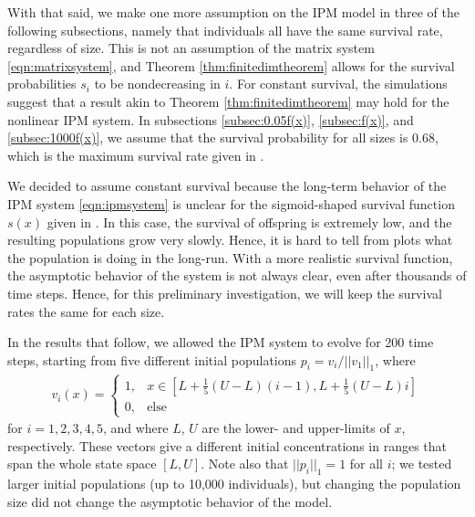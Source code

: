 With that said, we make one more assumption on the IPM model in three of the following subsections, namely that individuals all have the same survival rate, regardless of size. This is not an assumption of the matrix system \eqref{eqn:matrixsystem}, and Theorem \ref{thm:finitedimtheorem} allows for the survival probabilities $s_i$ to be nondecreasing in $i$. For constant survival, the simulations suggest that a result akin to Theorem \ref{thm:finitedimtheorem} may hold for the nonlinear IPM system. In subsections \ref{subsec:0.05f(x)}, \ref{subsec:f(x)}, and \ref{subsec:1000f(x)}, we assume that the survival probability for all sizes is $0.68$, which is the maximum survival rate given in \cite{Vindenes2014}. 

We decided to assume constant survival because the long-term behavior of the IPM system \eqref{eqn:ipmsystem} is unclear for the sigmoid-shaped survival function $s(x)$ given in \cite{Vindenes2014}. In this case, the survival of offspring is extremely low, and the resulting populations grow very slowly. Hence, it is hard to tell from plots what the population is doing in the long-run. With a more realistic survival function, the asymptotic behavior of the system is not always clear, even after thousands of time steps. Hence, for this preliminary investigation, we will keep the survival rates the same for each size.

In the results that follow, we allowed the IPM system to evolve for 200 time steps, starting from five different initial populations $p_i = v_i/||v_1||_1$, where
\begin{align}
	v_i(x) = \begin{cases} 1, & x \in \left[L + \frac{1}{5}(U-L)(i-1), L + \frac{1}{5}(U-L)i \right] \\ 0, & \text{else} \end{cases}
\end{align}
for $i = 1, 2, 3, 4, 5$, and where $L$, $U$ are the lower- and upper-limits of $x$, respectively. These vectors give a different initial concentrations in ranges that span the whole state space $[L, U]$. Note also that $||p_i||_1 = 1$ for all $i$; we tested larger initial populations (up to 10,000 individuals), but changing the population size did not change the asymptotic behavior of the model.

